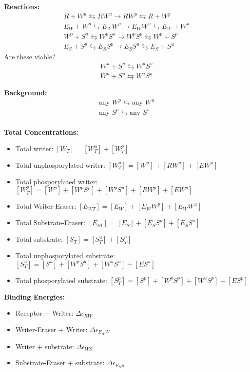 \documentclass[aps,onecolumn,superscriptaddress,notitlepage]{revtex4-1}
\begin{document}
\textbf{Reactions:}
\begin{gather}
R + W^u \leftrightarrows RW^u \rightarrow RW^p \leftrightarrows R + W^p\\
E_W + W^p \leftrightarrows E_WW^p \rightarrow E_WW^u \leftrightarrows E_W + W^u\\
W^p + S^u \leftrightarrows W^pS^u \rightarrow W^pS^p \leftrightarrows W^p + S^p\\
E_S + S^p \leftrightarrows E_SS^p \rightarrow E_SS^u \leftrightarrows E_S + S^u
\end{gather}
Are these viable?
\begin{align}
W^u + S^u \leftrightarrows W^uS^u\\
W^u + S^p \leftrightarrows W^uS^p
\end{align}

\textbf{Background:}
\begin{gather}
\text{any } W^p \leftrightarrows \text{any } W^u\\
\text{any } S^p \leftrightarrows \text{any } S^u\\
\end{gather}

\textbf{Total Concentrations:}
\begin{itemize}
\item Total writer: $[W_T] = [W^u_T] + [W^p_T]$
\item Total unphosporylated writer: $[W^u_T] = [W^u] + [RW^u] + [EW^u]$
\item Total phosporylated writer: $[W^p_T] = [W^p] + [W^pS^p] + [W^pS^u] + [RW^p] + [EW^p]$
\item Total Writer-Eraser: $[E_{WT}] = [E_W]  + [E_WW^p] + [E_WW^u]$
\item Total Substrate-Eraser: $[E_{ST}] = [E_S]  + [E_SS^p] + [E_SS^u]$
\item Total substrate: $[S_T] = [S^u_T] + [S^p_T]$
\item Total unphosporylated substrate: $[S^u_T] = [S^u] + [W^pS^u] + [W^uS^u] + [ES^u]$
\item Total phosporylated substrate: $[S^p_T] = [S^p] +  [W^pS^p] + [W^uS^p] + [ES^p]$
\end{itemize}


\textbf{Binding Energies:}
\begin{itemize}
\item Receptor + Writer: $\Delta\epsilon_{RW}$
\item Writer-Eraser + Writer: $\Delta\epsilon_{E_WW}$
\item Writer + substrate: $\Delta\epsilon_{WS}$
\item Substrate-Eraser + substrate: $\Delta\epsilon_{E_SS}$
\end{itemize}
\end{document}
